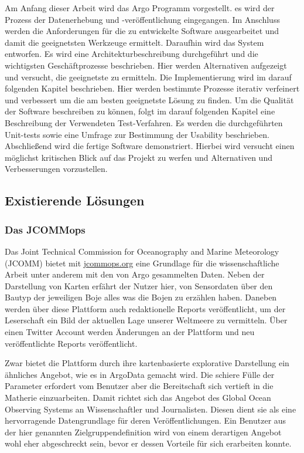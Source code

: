     Am Anfang dieser Arbeit wird das Argo Programm vorgestellt. es wird der Prozess der Datenerhebung und -veröffentlichung eingegangen. 
    Im Anschluss werden die Anforderungen für die zu entwickelte Software ausgearbeitet und damit die geeignetsten Werkzeuge ermittelt.
    Daraufhin wird das System entworfen. Es wird eine Architekturbeschreibung durchgeführt und die wichtigsten Geschäftprozesse beschrieben. Hier werden Alternativen aufgezeigt und versucht, die geeignetste zu ermitteln.
    Die Implementierung wird im darauf folgenden Kapitel beschrieben. Hier werden bestimmte Prozesse iterativ verfeinert und verbessert um die am besten geeignetste Lösung zu finden. 
    Um die Qualität der Software beschreiben zu können, folgt im darauf folgenden Kapitel eine Beschreibung der Verwendeten Test-Verfahren. Es werden die durchgeführten Unit-tests sowie eine Umfrage zur Bestimmung der Usability beschrieben.    
    Abschließend wird die fertige Software demonstriert. Hierbei wird versucht einen möglichst kritischen Blick auf das Projekt zu werfen und Alternativen und Verbesserungen vorzustellen.
    
    
    
\subsection{Existierende Lösungen}
  
\subsubsection{Das JCOMMops} 
   
   Das Joint Technical Commission for Oceanography and Marine Meteorology (JCOMM) bietet mit 
    \url{jcommops.org} eine Grundlage für die wissenschaftliche Arbeit unter anderem mit den von Argo gesammelten Daten. Neben der Darstellung von Karten erfährt der Nutzer hier, von Sensordaten über den Bautyp der jeweiligen Boje alles was die Bojen zu erzählen haben. Daneben werden über diese Plattform auch redaktionelle Reports veröffentlicht, um der Leserschaft ein Bild der aktuellen Lage unserer Weltmeere zu vermitteln. Über einen Twitter Account werden Änderungen an der Plattform und neu veröffentlichte Reports veröffentlicht. 
    
    Zwar bietet die Plattform durch ihre kartenbasierte explorative Darstellung ein ähnliches Angebot, wie es in ArgoData gemacht wird. Die schiere Fülle der Parameter erfordert vom Benutzer aber die Bereitschaft sich vertieft in die Matherie einzuarbeiten. Damit richtet sich das Angebot des Global Ocean Observing Systems an Wissenschaftler und Journalisten. Diesen dient sie als eine hervorragende Datengrundlage für deren Veröffentlichungen. Ein Benutzer aus der hier genannten Zielgruppendefinition wird von einem derartigen Angebot wohl eher abgeschreckt sein, bevor er dessen Vorteile für sich erarbeiten konnte. 
    
